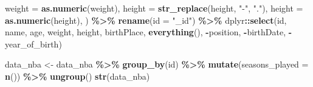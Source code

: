 \documentclass[
]{book}
\newenvironment{Shaded}{\begin{snugshade}}{\end{snugshade}}
\newcommand{\AttributeTok}[1]{\textcolor[rgb]{0.13,0.29,0.53}{#1}}
\newcommand{\FunctionTok}[1]{\textcolor[rgb]{0.13,0.29,0.53}{\textbf{#1}}}
\newcommand{\NormalTok}[1]{#1}
\newcommand{\OtherTok}[1]{\textcolor[rgb]{0.56,0.35,0.01}{#1}}
\newcommand{\SpecialCharTok}[1]{\textcolor[rgb]{0.81,0.36,0.00}{\textbf{#1}}}
\newcommand{\StringTok}[1]{\textcolor[rgb]{0.31,0.60,0.02}{#1}}
\begin{document}
\begin{Shaded}
\begin{Highlighting}[]
         \AttributeTok{weight =} \FunctionTok{as.numeric}\NormalTok{(weight),}
         \AttributeTok{height =} \FunctionTok{str\_replace}\NormalTok{(height, }\StringTok{"{-}"}\NormalTok{, }\StringTok{"."}\NormalTok{),}
         \AttributeTok{height =} \FunctionTok{as.numeric}\NormalTok{(height),}
\NormalTok{    ) }\SpecialCharTok{\%\textgreater{}\%}
  \FunctionTok{rename}\NormalTok{(}\AttributeTok{id =} \StringTok{"\_id"}\NormalTok{) }\SpecialCharTok{\%\textgreater{}\%}
\NormalTok{  dplyr}\SpecialCharTok{::}\FunctionTok{select}\NormalTok{(id, name, age, weight, height, birthPlace, }\FunctionTok{everything}\NormalTok{(), }\SpecialCharTok{{-}}\NormalTok{position, }\SpecialCharTok{{-}}\NormalTok{birthDate, }\SpecialCharTok{{-}}\NormalTok{year\_of\_birth)}

\NormalTok{data\_nba }\OtherTok{\textless{}{-}}\NormalTok{ data\_nba }\SpecialCharTok{\%\textgreater{}\%}
  \FunctionTok{group\_by}\NormalTok{(id) }\SpecialCharTok{\%\textgreater{}\%}
  \FunctionTok{mutate}\NormalTok{(}\AttributeTok{seasons\_played =} \FunctionTok{n}\NormalTok{()) }\SpecialCharTok{\%\textgreater{}\%}
  \FunctionTok{ungroup}\NormalTok{()}
\FunctionTok{str}\NormalTok{(data\_nba)}
\end{Highlighting}
\end{Shaded}
\end{document}
